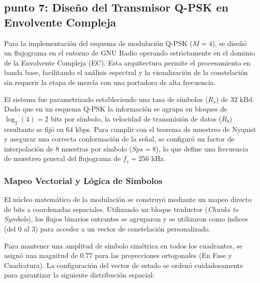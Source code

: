 \subsection*{ punto 7: Diseño del Transmisor Q-PSK en Envolvente Compleja}
Para la implementación del esquema de modulación Q-PSK ($M=4$), se diseñó un flujograma en el entorno de GNU Radio operando estrictamente en el dominio de la Envolvente Compleja (EC). Esta arquitectura permite el procesamiento en banda base, facilitando el análisis espectral y la visualización de la constelación sin requerir la etapa de mezcla con una portadora de alta frecuencia.

El sistema fue parametrizado estableciendo una tasa de símbolos ($R_s$) de $32$ kBd. Dado que en un esquema Q-PSK la información se agrupa en bloques de $\log_2(4) = 2$ bits por símbolo, la velocidad de transmisión de datos ($R_b$) resultante se fijó en $64$ kbps. Para cumplir con el teorema de muestreo de Nyquist y asegurar una correcta conformación de la señal, se configuró un factor de interpolación de $8$ muestras por símbolo ($Sps = 8$), lo que define una frecuencia de muestreo general del flujograma de $f_s = 256$ kHz.

\subsubsection*{Mapeo Vectorial y Lógica de Símbolos}
El núcleo matemático de la modulación se construyó mediante un mapeo directo de bits a coordenadas espaciales. Utilizando un bloque traductor (\textit{Chunks to Symbols}), los flujos binarios entrantes se agruparon y se utilizaron como índices (del 0 al 3) para acceder a un vector de constelación personalizado.

Para mantener una amplitud de símbolo simétrica en todos los cuadrantes, se asignó una magnitud de $0.77$ para las proyecciones ortogonales (En Fase y Cuadratura). La configuración del vector de estado se ordenó cuidadosamente para garantizar la siguiente distribución espacial:

